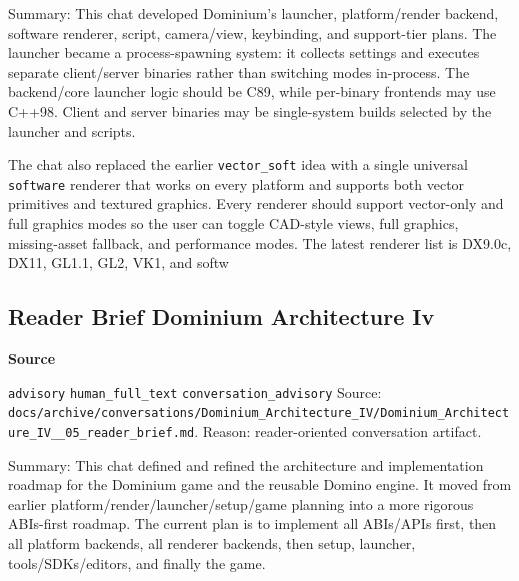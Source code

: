 \documentclass[9pt,a4paper,openany]{book}
\newcommand{\vonecallout}[3]{\par\medskip\noindent\begingroup\setlength{\fboxsep}{7pt}\colorbox{DomCalloutBg}{\parbox{0.94\linewidth}{\textbf{\textcolor{#1}{#2}}\par #3}}\endgroup\par\medskip}
\begin{document}
Summary: This chat developed Dominium's launcher, platform/\allowbreak{}render backend, software renderer, script, camera/\allowbreak{}view, keybinding, and support-\allowbreak{}tier plans.\allowbreak{} The launcher became a process-\allowbreak{}spawning system: it collects settings and executes separate client/\allowbreak{}server binaries rather than switching modes in-\allowbreak{}process.\allowbreak{} The backend/\allowbreak{}core launcher logic should be C89, while per-\allowbreak{}binary frontends may use C++98.\allowbreak{} Client and server binaries may be single-\allowbreak{}system builds selected by the launcher and scripts.\allowbreak{}


The chat also replaced the earlier \texttt{vector\_\allowbreak{}soft} idea with a single universal \texttt{software} renderer that works on every platform and supports both vector primitives and textured graphics.\allowbreak{} Every renderer should support vector-\allowbreak{}only and full graphics modes so the user can toggle CAD-\allowbreak{}style views, full graphics, missing-\allowbreak{}asset fallback, and performance modes.\allowbreak{} The latest renderer list is DX9.\allowbreak{}0c, DX11, GL1.\allowbreak{}1, GL2, VK1, and softw



\subsection{Reader Brief Dominium Architecture Iv}

\vonecallout{DomSlate}{Source}{\texttt{advisory} \texttt{human\_\allowbreak{}full\_\allowbreak{}text} \texttt{conversation\_\allowbreak{}advisory} Source: \texttt{docs/\allowbreak{}archive/\allowbreak{}conversations/\allowbreak{}Dominium\_\allowbreak{}Architecture\_\allowbreak{}IV/\allowbreak{}Dominium\_\allowbreak{}Architecture\_\allowbreak{}IV\_\allowbreak{}\_\allowbreak{}05\_\allowbreak{}reader\_\allowbreak{}brief.\allowbreak{}md}.\allowbreak{} Reason: reader-\allowbreak{}oriented conversation artifact.\allowbreak{}}

Summary: This chat defined and refined the architecture and implementation roadmap for the Dominium game and the reusable Domino engine.\allowbreak{} It moved from earlier platform/\allowbreak{}render/\allowbreak{}launcher/\allowbreak{}setup/\allowbreak{}game planning into a more rigorous ABIs-\allowbreak{}first roadmap.\allowbreak{} The current plan is to implement all ABIs/\allowbreak{}APIs first, then all platform backends, all renderer backends, then setup, launcher, tools/\allowbreak{}SDKs/\allowbreak{}editors, and finally the game.\allowbreak{}
\end{document}

